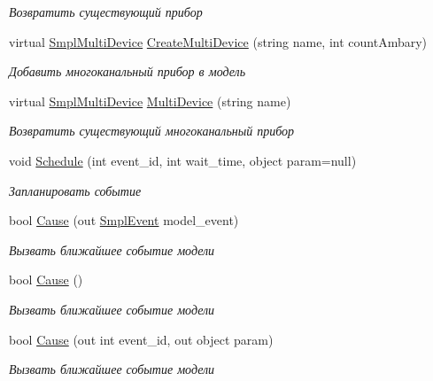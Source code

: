 \begin{DoxyCompactItemize}
\begin{DoxyCompactList}\small\item\em Возвратить существующий прибор \end{DoxyCompactList}\item 
virtual \hyperlink{class_s_m_p_l_sharp_1_1_objects_1_1_smpl_multi_device}{Smpl\-Multi\-Device} \hyperlink{class_s_m_p_l_sharp_1_1_smpl_model_a661c9fcf2482f3961c594b4a8d8b5f96}{Create\-Multi\-Device} (string name, int count\-Ambary)
\begin{DoxyCompactList}\small\item\em Добавить многоканальный прибор в модель \end{DoxyCompactList}\item 
virtual \hyperlink{class_s_m_p_l_sharp_1_1_objects_1_1_smpl_multi_device}{Smpl\-Multi\-Device} \hyperlink{class_s_m_p_l_sharp_1_1_smpl_model_a42d73f3d756bbf0375ba2012c708441d}{Multi\-Device} (string name)
\begin{DoxyCompactList}\small\item\em Возвратить существующий многоканальный прибор \end{DoxyCompactList}\item 
void \hyperlink{class_s_m_p_l_sharp_1_1_smpl_model_af567f319b044a2c6c98a80bff589ad04}{Schedule} (int event\-\_\-id, int wait\-\_\-time, object param=null)
\begin{DoxyCompactList}\small\item\em Запланировать событие \end{DoxyCompactList}\item 
bool \hyperlink{class_s_m_p_l_sharp_1_1_smpl_model_a1101457a63f40e7d80e707d7793f35ee}{Cause} (out \hyperlink{class_s_m_p_l_sharp_1_1_objects_1_1_smpl_event}{Smpl\-Event} model\-\_\-event)
\begin{DoxyCompactList}\small\item\em Вызвать ближайшее событие модели \end{DoxyCompactList}\item 
bool \hyperlink{class_s_m_p_l_sharp_1_1_smpl_model_ae2da4d875550fe62753443c0a7a276ee}{Cause} ()
\begin{DoxyCompactList}\small\item\em Вызвать ближайшее событие модели \end{DoxyCompactList}\item 
bool \hyperlink{class_s_m_p_l_sharp_1_1_smpl_model_a033dfe1b24a1864b7a4c8a85831aafd3}{Cause} (out int event\-\_\-id, out object param)
\begin{DoxyCompactList}\small\item\em Вызвать ближайшее событие модели \end{DoxyCompactList}\item 

\end{DoxyCompactItemize}
